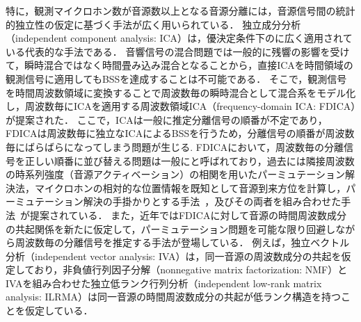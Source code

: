 特に，観測マイクロホン数が音源数以上となる音源分離には，音源信号間の統計的独立性の仮定に基づく手法が広く用いられている．
独立成分分析（independent component analysis: ICA）\cite{ICA}は，優決定条件下のに広く適用されている代表的な手法である．
音響信号の混合問題では一般的に残響の影響を受けて，瞬時混合ではなく時間畳み込み混合となることから，直接ICAを時間領域の観測信号に適用してもBSSを達成することは不可能である．
そこで，観測信号を時間周波数領域に変換することで周波数毎の瞬時混合として混合系をモデル化し，周波数毎にICAを適用する周波数領域ICA（frequency-domain ICA: FDICA）\cite{FDICA}が提案された．
ここで，ICAは一般に推定分離信号の順番が不定であり，FDICAは周波数毎に独立なICAによるBSSを行うため，分離信号の順番が周波数毎にばらばらになってしまう問題が生じる.
FDICAにおいて，周波数毎の分離信号を正しい順番に並び替える問題は一般にと呼ばれており，過去には隣接周波数の時系列強度（音源アクティベーション）の相関を用いたパーミュテーション解決法，マイクロホンの相対的な位置情報を既知として音源到来方位を計算し，パーミュテーション解決の手掛かりとする手法~\cite{DOA}，及びその両者を組み合わせた手法~\cite{DOACOR}が提案されている．
また，近年ではFDICAに対して音源の時間周波数成分の共起関係を新たに仮定して，パーミュテーション問題を可能な限り回避しながら周波数毎の分離信号を推定する手法が登場している．
例えば，独立ベクトル分析（independent vector analysis: IVA）\cite{IVA1,IVA2}は，同一音源の周波数成分の共起を仮定しており，非負値行列因子分解（nonnegative matrix factorization: NMF）\cite{NMF}とIVAを組み合わせた独立低ランク行列分析（independent low-rank matrix analysis: ILRMA）\cite{ILRMA1,ILRMA2}は同一音源の時間周波数成分の共起が低ランク構造を持つことを仮定している．


